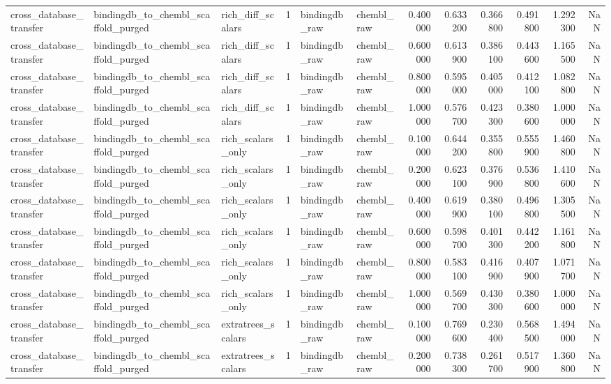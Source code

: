 \begin{longtable}{lllrllrrrrrr}
cross\_database\_transfer & bindingdb\_to\_chembl\_scaffold\_purged & rich\_diff\_scalars & 1 & bindingdb\_raw & chembl\_raw & 0.400000 & 0.633200 & 0.366800 & 0.491800 & 1.292300 & NaN \\
cross\_database\_transfer & bindingdb\_to\_chembl\_scaffold\_purged & rich\_diff\_scalars & 1 & bindingdb\_raw & chembl\_raw & 0.600000 & 0.613900 & 0.386100 & 0.443600 & 1.165500 & NaN \\
cross\_database\_transfer & bindingdb\_to\_chembl\_scaffold\_purged & rich\_diff\_scalars & 1 & bindingdb\_raw & chembl\_raw & 0.800000 & 0.595000 & 0.405000 & 0.412100 & 1.082800 & NaN \\
cross\_database\_transfer & bindingdb\_to\_chembl\_scaffold\_purged & rich\_diff\_scalars & 1 & bindingdb\_raw & chembl\_raw & 1.000000 & 0.576700 & 0.423300 & 0.380600 & 1.000000 & NaN \\
cross\_database\_transfer & bindingdb\_to\_chembl\_scaffold\_purged & rich\_scalars\_only & 1 & bindingdb\_raw & chembl\_raw & 0.100000 & 0.644200 & 0.355800 & 0.555900 & 1.460800 & NaN \\
cross\_database\_transfer & bindingdb\_to\_chembl\_scaffold\_purged & rich\_scalars\_only & 1 & bindingdb\_raw & chembl\_raw & 0.200000 & 0.623100 & 0.376900 & 0.536800 & 1.410600 & NaN \\
cross\_database\_transfer & bindingdb\_to\_chembl\_scaffold\_purged & rich\_scalars\_only & 1 & bindingdb\_raw & chembl\_raw & 0.400000 & 0.619900 & 0.380100 & 0.496800 & 1.305500 & NaN \\
cross\_database\_transfer & bindingdb\_to\_chembl\_scaffold\_purged & rich\_scalars\_only & 1 & bindingdb\_raw & chembl\_raw & 0.600000 & 0.598700 & 0.401300 & 0.442200 & 1.161800 & NaN \\
cross\_database\_transfer & bindingdb\_to\_chembl\_scaffold\_purged & rich\_scalars\_only & 1 & bindingdb\_raw & chembl\_raw & 0.800000 & 0.583100 & 0.416900 & 0.407900 & 1.071700 & NaN \\
cross\_database\_transfer & bindingdb\_to\_chembl\_scaffold\_purged & rich\_scalars\_only & 1 & bindingdb\_raw & chembl\_raw & 1.000000 & 0.569700 & 0.430300 & 0.380600 & 1.000000 & NaN \\
cross\_database\_transfer & bindingdb\_to\_chembl\_scaffold\_purged & extratrees\_scalars & 1 & bindingdb\_raw & chembl\_raw & 0.100000 & 0.769600 & 0.230400 & 0.568500 & 1.494000 & NaN \\
cross\_database\_transfer & bindingdb\_to\_chembl\_scaffold\_purged & extratrees\_scalars & 1 & bindingdb\_raw & chembl\_raw & 0.200000 & 0.738300 & 0.261700 & 0.517900 & 1.360800 & NaN \\

\end{longtable}
